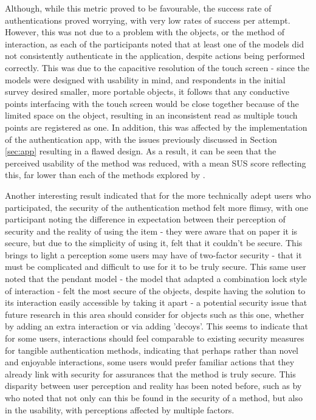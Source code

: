 \documentclass{l4proj}
\begin{document}
Although, while this metric proved to be favourable, the success rate of authentications proved worrying, with very low rates of success per attempt. However, this was not due to a problem with the objects, or the method of interaction, as each of the participants noted that at least one of the models did not consistently authenticate in the application, despite actions being performed correctly. This was due to the capacitive resolution of the touch screen - since the models were designed with usability in mind, and respondents in the initial survey desired smaller, more portable objects, it follows that any conductive points interfacing with the touch screen would be close together because of the limited space on the object, resulting in an inconsistent read as multiple touch points are registered as one. In addition, this was affected by the implementation of the authentication app, with the issues previously discussed in Section \ref{sec:app} resulting in a flawed design. As a result, it can be seen that the perceived usability of the method was reduced, with a mean SUS score reflecting this, far lower than each of the methods explored by \cite{reese2019usability}.

Another interesting result indicated that for the more technically adept users who participated, the security of the authentication method felt more flimsy, with one participant noting the difference in expectation between their perception of security and the reality of using the item - they were aware that on paper it is secure, but due to the simplicity of using it, felt that it couldn't be secure. This brings to light a perception some users may have of two-factor security - that it must be complicated and difficult to use for it to be truly secure. This same user noted that the pendant model - the model that adapted a combination lock style of interaction - felt the most secure of the objects, despite having the solution to its interaction easily accessible by taking it apart - a potential security issue that future research in this area should consider for objects such as this one, whether by adding an extra interaction or via adding 'decoys'. This seems to indicate that for some users, interactions should feel comparable to existing security measures for tangible authentication methods, indicating that perhaps rather than novel and enjoyable interactions, some users would prefer familiar actions that they already link with security for assurances that the method is truly secure. This disparity between user perception and reality has been noted before, such as by \cite{zimmermann2020password} who noted that not only can this be found in the security of a method, but also in the usability, with perceptions affected by multiple factors.
\end{document}

